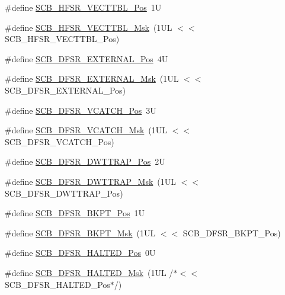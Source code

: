 \begin{DoxyCompactItemize}
\item 
\#define \hyperlink{group___c_m_s_i_s___s_c_b_ga77993da8de35adea7bda6a4475f036ab}{S\+C\+B\+\_\+\+H\+F\+S\+R\+\_\+\+V\+E\+C\+T\+T\+B\+L\+\_\+\+Pos}~1U
\item 
\#define \hyperlink{group___c_m_s_i_s___s_c_b_gaac5e289211d0a63fe879a9691cb9e1a9}{S\+C\+B\+\_\+\+H\+F\+S\+R\+\_\+\+V\+E\+C\+T\+T\+B\+L\+\_\+\+Msk}~(1\+U\+L $<$$<$ S\+C\+B\+\_\+\+H\+F\+S\+R\+\_\+\+V\+E\+C\+T\+T\+B\+L\+\_\+\+Pos)
\item 
\#define \hyperlink{group___c_m_s_i_s___s_c_b_ga13f502fb5ac673df9c287488c40b0c1d}{S\+C\+B\+\_\+\+D\+F\+S\+R\+\_\+\+E\+X\+T\+E\+R\+N\+A\+L\+\_\+\+Pos}~4U
\item 
\#define \hyperlink{group___c_m_s_i_s___s_c_b_ga3cba2ec1f588ce0b10b191d6b0d23399}{S\+C\+B\+\_\+\+D\+F\+S\+R\+\_\+\+E\+X\+T\+E\+R\+N\+A\+L\+\_\+\+Msk}~(1\+U\+L $<$$<$ S\+C\+B\+\_\+\+D\+F\+S\+R\+\_\+\+E\+X\+T\+E\+R\+N\+A\+L\+\_\+\+Pos)
\item 
\#define \hyperlink{group___c_m_s_i_s___s_c_b_gad02d3eaf062ac184c18a7889c9b6de57}{S\+C\+B\+\_\+\+D\+F\+S\+R\+\_\+\+V\+C\+A\+T\+C\+H\+\_\+\+Pos}~3U
\item 
\#define \hyperlink{group___c_m_s_i_s___s_c_b_gacbb931575c07b324ec793775b7c44d05}{S\+C\+B\+\_\+\+D\+F\+S\+R\+\_\+\+V\+C\+A\+T\+C\+H\+\_\+\+Msk}~(1\+U\+L $<$$<$ S\+C\+B\+\_\+\+D\+F\+S\+R\+\_\+\+V\+C\+A\+T\+C\+H\+\_\+\+Pos)
\item 
\#define \hyperlink{group___c_m_s_i_s___s_c_b_gaccf82364c6d0ed7206f1084277b7cc61}{S\+C\+B\+\_\+\+D\+F\+S\+R\+\_\+\+D\+W\+T\+T\+R\+A\+P\+\_\+\+Pos}~2U
\item 
\#define \hyperlink{group___c_m_s_i_s___s_c_b_ga3f7384b8a761704655fd45396a305663}{S\+C\+B\+\_\+\+D\+F\+S\+R\+\_\+\+D\+W\+T\+T\+R\+A\+P\+\_\+\+Msk}~(1\+U\+L $<$$<$ S\+C\+B\+\_\+\+D\+F\+S\+R\+\_\+\+D\+W\+T\+T\+R\+A\+P\+\_\+\+Pos)
\item 
\#define \hyperlink{group___c_m_s_i_s___s_c_b_gaf28fdce48655f0dcefb383aebf26b050}{S\+C\+B\+\_\+\+D\+F\+S\+R\+\_\+\+B\+K\+P\+T\+\_\+\+Pos}~1U
\item 
\#define \hyperlink{group___c_m_s_i_s___s_c_b_ga609edf8f50bc49adb51ae28bcecefe1f}{S\+C\+B\+\_\+\+D\+F\+S\+R\+\_\+\+B\+K\+P\+T\+\_\+\+Msk}~(1\+U\+L $<$$<$ S\+C\+B\+\_\+\+D\+F\+S\+R\+\_\+\+B\+K\+P\+T\+\_\+\+Pos)
\item 
\#define \hyperlink{group___c_m_s_i_s___s_c_b_gaef4ec28427f9f88ac70a13ae4e541378}{S\+C\+B\+\_\+\+D\+F\+S\+R\+\_\+\+H\+A\+L\+T\+E\+D\+\_\+\+Pos}~0U
\item 
\#define \hyperlink{group___c_m_s_i_s___s_c_b_ga200bcf918d57443b5e29e8ce552e4bdf}{S\+C\+B\+\_\+\+D\+F\+S\+R\+\_\+\+H\+A\+L\+T\+E\+D\+\_\+\+Msk}~(1\+U\+L /$\ast$$<$$<$ S\+C\+B\+\_\+\+D\+F\+S\+R\+\_\+\+H\+A\+L\+T\+E\+D\+\_\+\+Pos$\ast$/)
$$
\end{DoxyCompactItemize}
